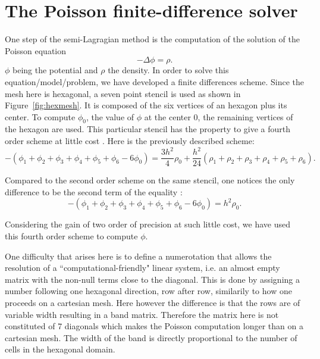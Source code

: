 \documentclass[proc]{edpsmath}
\begin{document}
\section{The Poisson finite-difference solver}
\label{sec:poisson_eqn}


One step of the semi-Lagragian method is the computation of the solution of the Poisson equation
\begin{equation*}
	- \Delta \phi = \rho .
\end{equation*}
 $\phi$ being the potential and $\rho$ the density.
 In order to solve this equation/model/problem, we have developed a finite differences scheme. Since the mesh here is hexagonal, a seven point stencil is used as shown in Figure~\ref{fig:hexmesh}. It is composed of the six vertices of an hexagon plus its center. To compute  $\phi_0$, the value of $\phi$ at the center $0$,  the remaining vertices of the hexagon are used. 
 This particular stencil has the property to give a fourth order scheme at little cost \cite{poisson}. Here is the previously described scheme:
\begin{equation*}
-(\phi_1 + \phi_2 + \phi_3 + \phi_4 +\phi_5 + \phi_6 - 6 \phi_0)  = \frac{3h^2}{4} \rho_0 + \frac{h^2}{24}(\rho_1+\rho_2+\rho_3+\rho_4+\rho_5+\rho_6).
\end{equation*} 

Compared to the second order scheme on the same stencil, one notices the only difference to be the second term of the equality :  
\begin{equation*}
-(\phi_1 + \phi_2 + \phi_3 + \phi_4 +\phi_5 + \phi_6 - 6 \phi_0)  = h^2 \rho_0.
\end{equation*} 

Considering the gain of two order of precision at such little cost, we have used this fourth order scheme to compute $\phi$.

 \rmrk One difficulty that arises here is to define a numerotation that allows the resolution of a ``computational-friendly" linear system, i.e. an almost empty matrix with the non-null terms close to the diagonal. This is done by assigning a number following one hexagonal direction, row after row, similarily to how one proceeds on a cartesian mesh. Here however the difference is that the rows are of variable width resulting in a band matrix. Therefore the matrix here is not constituted of 7 diagonals which makes the Poisson computation longer than on a cartesian mesh. The width of the band is directly proportional to the number of cells in the hexagonal domain.  
\end{document}
